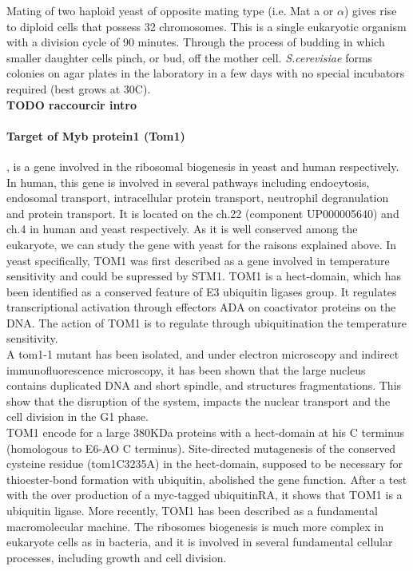 \documentclass[10pt,a4paper]{article}
\begin{document}
\noindent Mating of two haploid yeast of opposite mating type (i.e. Mat a or $\alpha $) gives rise to diploid cells that possess 32 chromosomes. This is a single eukaryotic organism with a division cycle of 90 minutes. Through the process of budding in which smaller daughter cells pinch, or bud, off the mother cell. \textit{S.cerevisiae} forms colonies on agar plates in the laboratory in a few days with no special incubators required (best grows at 30\degree C).\\


\textbf{TODO raccourcir intro}

\paragraph{Target of Myb protein1 (Tom1)}, is a gene involved in the ribosomal biogenesis in yeast and human respectively. In human, this gene is involved in several pathways including endocytosis, endosomal transport, intracellular protein transport, neutrophil degranulation and protein transport\cite{seroussi_tom1genes_1999,seet_endofin_2004}. It is located on the ch.22 (component UP000005640) and ch.4 in human and yeast respectively. As it is well conserved among the eukaryote, we can study the gene with yeast for the raisons explained above. In yeast specifically, TOM1 was first described as a gene involved in temperature sensitivity and could be supressed by STM1\cite{utsugi_high_1995}. TOM1 is a hect-domain, which has been identified as a conserved feature of E3 ubiquitin ligases group. It regulates transcriptional activation through effectors ADA on coactivator proteins on the DNA. The action of TOM1 is to regulate through ubiquitination the temperature sensitivity\cite{saleh_tom1p_1998}. \\

\noindent A tom1-1 mutant has been isolated, and under electron microscopy and indirect immunofluorescence microscopy, it has been shown that the large nucleus contains duplicated DNA and short spindle, and structures fragmentations. This show that the disruption of the system, impacts the nuclear transport and the cell division in the G1 phase\cite{seet_endofin_2004,utsugi_yeast_1999}.\\ 


\noindent TOM1 encode for a large 380KDa proteins with a hect-domain at his C terminus (homologous to E6-AO C terminus). Site-directed mutagenesis of the conserved cysteine residue (tom1C3235A) in the hect-domain, supposed to be necessary for thioester-bond formation with ubiquitin, abolished the gene function. After a test with the over production of a myc-tagged ubiquitinRA, it shows that TOM1 is a ubiquitin ligase\cite{utsugi_yeast_1999}. More recently, TOM1 has been described as a fundamental macromolecular machine. The ribosomes biogenesis is much more complex in eukaryote cells as in bacteria, and it is involved in several fundamental cellular processes, including growth and cell division\cite{dinman_eukaryotic_2009}.\\
\end{document}
